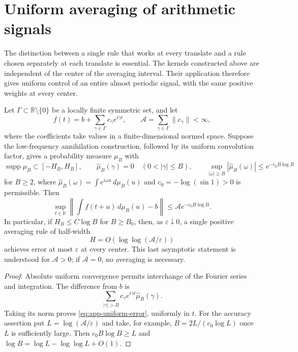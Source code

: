 \section{Uniform averaging of arithmetic signals}\label{sec:applications}

The distinction between a single rule that works at every translate and a rule
chosen separately at each translate is essential.  The kernels constructed
above are independent of the center of the averaging interval.  Their
application therefore gives uniform control of an entire almost periodic
signal, with the same positive weights at every center.

\begin{theorem}\label{thm:app-uniform}
Let $\Gamma\subset\mathbb R\setminus\{0\}$ be a locally finite symmetric set,
and let
\[
 f(t)=b+\sum_{\gamma\in\Gamma}c_\gamma e^{i\gamma t},
 \qquad \mathcal A=\sum_{\gamma\in\Gamma}\|c_\gamma\|<\infty,
\]
where the coefficients take values in a finite-dimensional normed space.
Suppose the low-frequency annihilation construction, followed by its uniform
convolution factor, gives a probability measure $\mu_B$ with
\[
 \operatorname{supp}\mu_B\subset[-H_B,H_B],\qquad
 \widehat\mu_B(\gamma)=0\quad(0<|\gamma|\le B),\qquad
 \sup_{|\omega|\ge B}|\widehat\mu_B(\omega)|\le e^{-c_0B\log B}
\]
for $B\ge2$, where $\widehat\mu_B(\omega)=\int e^{i\omega u}\,d\mu_B(u)$
and $c_0=-\log(\sin 1)>0$ is permissible.  Then
\begin{equation}\label{eq:app-uniform-error}
 \sup_{t\in\mathbb R}
 \left\|\int f(t+u)\,d\mu_B(u)-b\right\|
 \le \mathcal A e^{-c_0B\log B}.
\end{equation}
In particular, if $H_B\le C\log B$ for $B\ge B_0$, then, as
$\varepsilon\downarrow0$, a single positive averaging rule of half-width
\[
 H=O\!\left(\log\log(\mathcal A/\varepsilon)\right)
\]
achieves error at most $\varepsilon$ at every center.  This last asymptotic
statement is understood for $\mathcal A>0$; if $\mathcal A=0$, no averaging
is necessary.
\end{theorem}

\begin{proof}
Absolute uniform convergence permits interchange of the Fourier series and
integration.  The difference from $b$ is
\[
 \sum_{|\gamma|>B}c_\gamma e^{i\gamma t}\widehat\mu_B(\gamma).
\]
Taking its norm proves \eqref{eq:app-uniform-error}, uniformly in $t$.
For the accuracy assertion put $L=\log(\mathcal A/\varepsilon)$ and take,
for example, $B=2L/(c_0\log L)$ once $L$ is sufficiently large.  Then
$c_0B\log B\ge L$ and
$\log B=\log L-\log\log L+O(1)$.
\end{proof}

